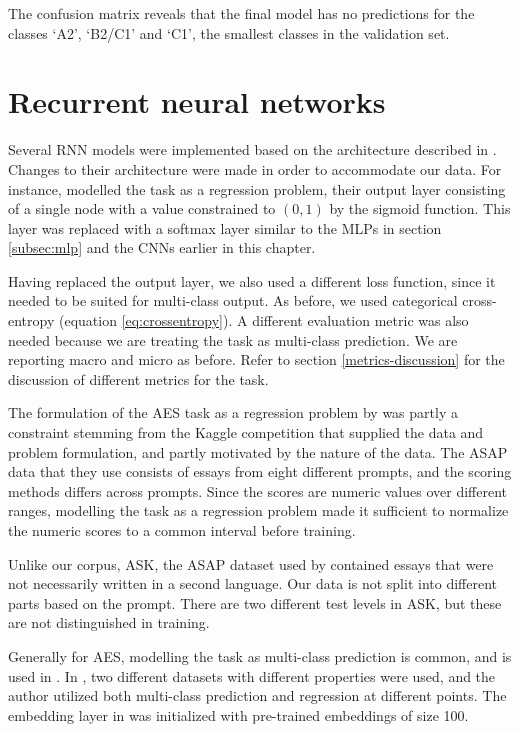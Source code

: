 The confusion matrix reveals that the final model has no predictions for the
classes `A2', `B2/C1' and `C1', the smallest classes in the validation set.


\section{Recurrent neural networks}

Several \ac{RNN} models were implemented based on the architecture described in
\textcite{taghipour16}. Changes to their architecture were made in
order to accommodate our data. For instance, \citeauthor{taghipour16} modelled
the task as a regression problem, their output layer consisting of a single
node with a value constrained to $(0,1)$ by the sigmoid function. This layer
was replaced with a softmax layer similar to the \acp{MLP} in section
\ref{subsec:mlp} and the \acp{CNN} earlier in this chapter.

Having replaced the output layer, we also used a different loss function,
since it needed to be suited for multi-class output. As before, we used
categorical cross-entropy (equation \ref{eq:crossentropy}). A different
evaluation metric was also needed because we are treating the task as
multi-class prediction. We are reporting macro and micro \FI as before. Refer
to section \ref{metrics-discussion} for the discussion of different metrics
for the task.

The formulation of the \ac{AES} task as a regression problem by
\citeauthor{taghipour16} was partly a constraint stemming from the Kaggle
competition that supplied the data and problem formulation, and partly
motivated by the nature of the data. The ASAP data that they use consists of
essays from eight different prompts, and the scoring methods differs across
prompts. Since the scores are numeric values over different ranges, modelling
the task as a regression problem made it sufficient to normalize the numeric
scores to a common interval before training.

Unlike our corpus, ASK, the ASAP dataset used by \citeauthor{taghipour16}
contained essays that were not necessarily written in a second language. Our
data is not split into different parts based on the prompt. There are two
different test levels in ASK, but these are not distinguished in training.

 Generally for \ac{AES}, modelling
the task as multi-class prediction is common, and is used in
\textcite{vajjala18universalCEFR}. In \textcite{vajjala17}, two different
datasets with different properties were used, and the author utilized both
multi-class prediction and regression at different points. The embedding
layer in \textcite{taghipour16} was initialized with pre-trained embeddings
of size 100.


